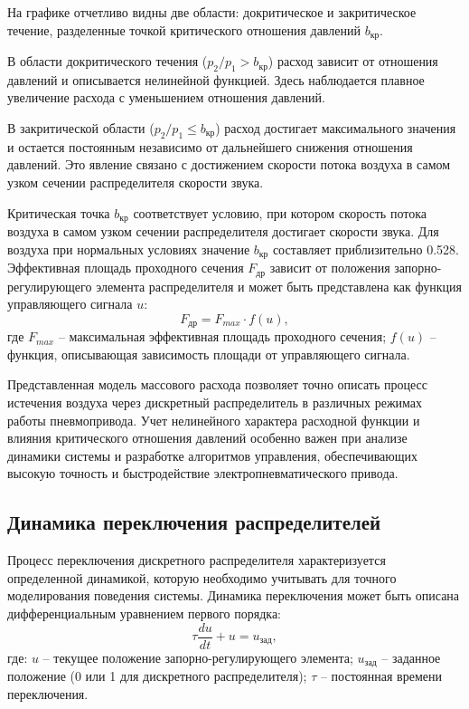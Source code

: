 На графике отчетливо видны две области: докритическое и закритическое течение, разделенные точкой
критического отношения давлений $b_{кр}$.

В области докритического течения ($p_2/p_1 > b_{кр}$) расход зависит от отношения давлений и
описывается нелинейной функцией. Здесь наблюдается плавное увеличение расхода с уменьшением отношения давлений.

В закритической области ($p_2/p_1 \leq b_{кр}$) расход достигает максимального
значения и остается постоянным независимо от дальнейшего снижения отношения давлений.
Это явление связано с достижением скорости потока воздуха
в самом узком сечении распределителя скорости звука.

Критическая точка $b_{кр}$ соответствует условию, при котором скорость потока
воздуха в самом узком сечении распределителя достигает скорости звука. Для
воздуха при нормальных условиях значение $b_{кр}$ составляет приблизительно \num{0.528}.
Эффективная площадь проходного сечения $F_\text{др}$ зависит от
положения запорно-регулирующего элемента распределителя и может
быть представлена как функция управляющего сигнала $u$:
\begin{equation*}
    F_\text{др} = F_{max} \cdot f(u),
\end{equation*}
где $F_{max}$ -- максимальная эффективная площадь проходного сечения;
$f(u)$ -- функция, описывающая зависимость площади от управляющего сигнала.

Представленная модель массового расхода позволяет точно описать процесс истечения
воздуха через дискретный распределитель в различных режимах работы
пневмопривода. Учет нелинейного характера расходной функции и
влияния критического отношения давлений особенно важен при анализе динамики
системы и разработке алгоритмов управления, обеспечивающих высокую точность
и быстродействие электропневматического привода.

\subsection{Динамика переключения распределителей}\label{sec:ch2/sec3/subsec2}

Процесс переключения дискретного распределителя характеризуется
определенной динамикой, которую необходимо учитывать для точного моделирования поведения
системы. Динамика переключения может быть описана дифференциальным уравнением первого порядка:
\begin{equation}\label{eq:ch2/switching_dynamics}
    \tau \frac{du}{dt} + u = u_{зад},
\end{equation}
где:
$u$ -- текущее положение запорно-регулирующего элемента;
$u_{зад}$ -- заданное положение (0 или 1 для дискретного распределителя);
$\tau$ -- постоянная времени переключения.

